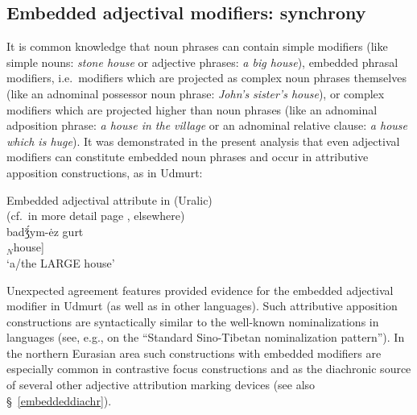 \subsection{Embedded adjectival modifiers: synchrony} \label{embeddedsynchr}
It is common knowledge that noun phrases can contain simple modifiers (like simple nouns: \textit{stone house} or adjective phrases: \textit{a big house}), embedded phrasal modifiers, i.e.~modifiers which are projected as complex noun phrases themselves (like an adnominal possessor noun phrase: \textit{John's sister's house}), or complex modifiers which are projected higher than noun phrases (like an adnominal adposition phrase: \textit{a house in the village} or an adnominal relative clause: \textit{a house which is huge}). It was demonstrated in the present analysis that even adjectival modifiers can constitute embedded noun phrases and occur in attributive apposition constructions, as in Udmurt:
\begin{exe}
\ex \rm{Embedded adjectival attribute in  (Uralic)}\\(cf.~in more detail page \pageref{udmurt synchr}, elsewhere)\\
\gll	{}		{}		badǯ́ym-ėz gurt\\
	[$_{NP}$ 	[$_{NP'}$ $_{A}$big-\textsc{nmlz}] $_{N}$house]\\
\glt	‘a/the LARGE house’
\end{exe}
Unexpected agreement features provided evidence for the embedded adjectival modifier in Udmurt (as well as in other languages). Such attributive apposition constructions are syntactically similar to the well-known nominalizations in  languages (see, e.g., \citealt{bickel1999} on the “Standard Sino-Tibetan nominalization pattern”). In the northern Eurasian area such constructions with embedded modifiers are especially  common in contrastive focus constructions and as the diachronic source of several other adjective attribution marking devices (see also \S~\ref{embeddeddiachr}). 

